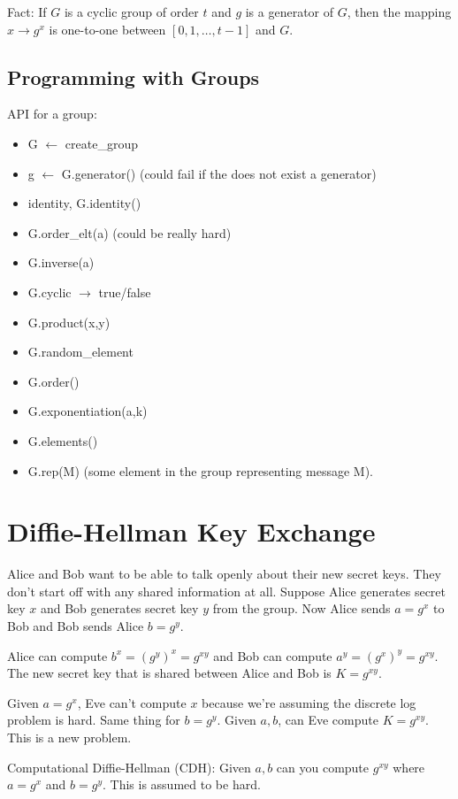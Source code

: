 \documentclass[psamsfonts]{amsart}
\begin{document}
Fact: If $G$ is a cyclic group of order $t$ and $g$ is a generator of $G$, then the mapping $x \to g^x$ is one-to-one between $[0,1, \ldots, t-1]$ and $G$.

\subsection{Programming with Groups}

API for a group:
\begin{itemize}
  \item G $\leftarrow$ create\_group
  \item g $\leftarrow$ G.generator() (could fail if the does not exist a generator)
  \item identity, G.identity()
  \item G.order\_elt(a) (could be really hard)
  \item G.inverse(a)
  \item G.cyclic $\rightarrow$ true/false
  \item G.product(x,y)
  \item G.random\_element
  \item G.order()
  \item G.exponentiation(a,k)
  \item G.elements()
  \item G.rep(M) (some element in the group representing message M).
\end{itemize}

\section{Diffie-Hellman Key Exchange}

Alice and Bob want to be able to talk openly about their new secret keys. They don't start off with any shared information at all. Suppose Alice generates secret key $x$ and Bob generates secret key $y$ from the group. Now Alice sends $a = g^x$ to Bob and Bob sends Alice $b = g^y$.

Alice can compute $b^x = (g^y)^x = g^{xy}$ and Bob can compute $a^y = (g^x)^y = g^{xy}$. The new secret key that is shared between Alice and Bob is $K = g^{xy}$.

Given  $a = g^x$, Eve can't compute $x$ because we're assuming the discrete log problem is hard. Same thing for $b = g^y$. Given $a,b$, can Eve compute $K = g^{xy}$. This is a new problem.

Computational Diffie-Hellman (CDH): Given $a,b$ can you compute $g^{xy}$ where $a = g^{x}$ and $b = g^{y}$. This is assumed to be hard.
\end{document}
